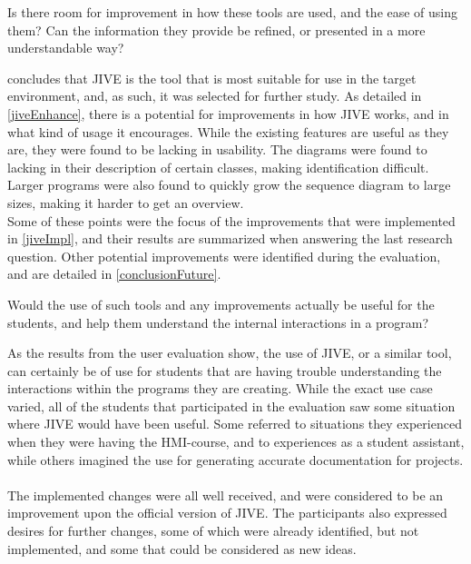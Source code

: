 \begin{theorem}
Is there room for improvement in how these tools are used, and the ease of using them? Can the information they provide be refined, or presented in a more understandable way?
\end{theorem}

 concludes that JIVE is the tool that is most suitable for use in the target environment, and, as such, it was selected for further study.
As detailed in \cref{jiveEnhance}, there is a potential for improvements in how JIVE works, and in what kind of usage it encourages.
While the existing features are useful as they are, they were found to be lacking in usability.
The diagrams were found to lacking in their description of certain classes, making identification difficult.
Larger programs were also found to quickly grow the sequence diagram to large sizes, making it harder to get an overview.
~\\

Some of these points were the focus of the improvements that were implemented in \cref{jiveImpl}, and their results are summarized when answering the last research question.
Other potential improvements were identified during the evaluation, and are detailed in \cref{conclusionFuture}.
~\\

\begin{theorem}
Would the use of such tools and any improvements actually be useful for the students, and help them understand the internal interactions in a program?
\end{theorem}

As the results from the user evaluation show, the use of JIVE, or a similar tool, can certainly be of use for students that are having trouble understanding the interactions within the programs they are creating.
While the exact use case varied, all of the students that participated in the evaluation saw some situation where JIVE would have been useful.
Some referred to situations they experienced when they were having the HMI-course, and to experiences as a student assistant, while others imagined the use for generating accurate documentation for projects.
~\\

The implemented changes were all well received, and were considered to be an improvement upon the official version of JIVE.
The participants also expressed desires for further changes, some of which were already identified, but not implemented, and some that could be considered as new ideas.
~\\

